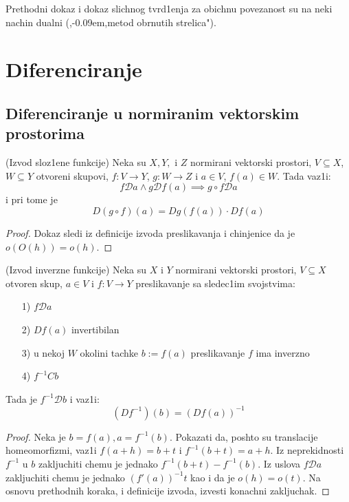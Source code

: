 \documentclass[a4paper,12pt]{article}
\newcommand{\psj}{\subseteq}
\def\zn{,\kern-0.09em,} %
\begin{document}
\begin{nap}
	Prethodni dokaz i dokaz slichnog tvrd1enja za obichnu povezanost su na neki nachin dualni (\zn metod obrnutih strelica").
\end{nap}

\section{Diferenciranje}
\subsection{Diferenciranje u normiranim vektorskim prostorima}

\begin{tma}(Izvod sloz1ene funkcije)
Neka su $X, Y,$ i $Z$ normirani vektorski prostori, $V \psj X$, $W \psj Y$ otvoreni skupovi, $f: V \to Y$, $g: W \to Z$ i $a \in V$, $f(a) \in W$. Tada vaz1i:
\[f\mathcal{D} a \wedge g \mathcal{D} f(a) \implies g\circ f \mathcal{D} a\]
i pri tome je
\[D(g \circ f) (a) = Dg(f(a))\cdot Df(a) \]
\end{tma}
\begin{proof}
Dokaz sledi iz definicije izvoda preslikavanja i chinjenice da je $o(O(h)) = o(h)$.
\end{proof}

\begin{tma}(Izvod inverzne funkcije)
Neka su $X$ i $Y$ normirani vektorski prostori, $V \psj X$ otvoren skup, $a\in V$ i $f: V \to Y$ preslikavanje sa sledec1im svojstvima:
\begin{itemize}
\item[1)] $f \mathcal{D} a$
\item[2)] $Df(a)$ invertibilan
\item[3)] u nekoj $W$ okolini tachke $b := f(a)$ preslikavanje $f$ ima inverzno
\item[4)] $f^{-1} C b$
\end{itemize}
Tada je $f^{-1} \mathcal{D} b$ i vaz1i:
\[(Df^{-1})(b) = {(Df(a))}^{-1}\]
\end{tma}
\begin{proof}
Neka je $b = f(a), a = f^{-1}(b)$. Pokazati da, poshto su translacije homeomorfizmi, vaz1i $f(a+h) = b+t$ i $f^{-1}(b+t) = a+h$. Iz neprekidnosti $f^{-1}$ u $b$ zakljuchiti chemu je jednako $f^{-1} (b+t) - f^{-1}(b)$. Iz uslova $f \mathcal{D} a$ zakljuchiti chemu je jednako ${(f'(a))}^{-1} t$ kao i da je $o(h) = o(t)$. Na osnovu prethodnih koraka, i definicije izvoda, izvesti konachni zakljuchak.
\end{proof}
\end{document}

